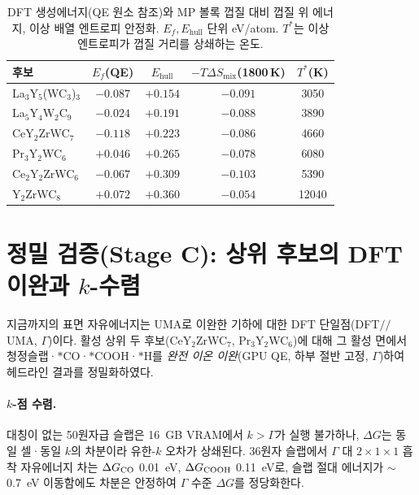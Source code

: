 \documentclass[11pt,a4paper]{report}
\begin{document}
\begin{table}[t]
\centering
\caption{DFT 생성에너지(QE 원소 참조)와 MP 볼록 껍질 대비 껍질 위 에너지, 이상 배열 엔트로피
안정화. $E_f, E_{\mathrm{hull}}$ 단위 eV/atom. $T^\ast$는 이상 엔트로피가 껍질 거리를 상쇄하는 온도.}
\label{tab:hull}
\small
\begin{tabular}{lcccc}
\hline
후보 & $E_f$(QE) & $E_{\mathrm{hull}}$ & $-T\Delta S_{\mathrm{mix}}$(1800\,K) & $T^\ast$(K) \\
\hline
La$_3$Y$_5$(WC$_3$)$_3$ & $-0.087$ & $+0.154$ & $-0.091$ & 3050 \\
La$_5$Y$_4$W$_2$C$_9$   & $-0.024$ & $+0.191$ & $-0.088$ & 3890 \\
CeY$_2$ZrWC$_7$         & $-0.118$ & $+0.223$ & $-0.086$ & 4660 \\
Pr$_3$Y$_2$WC$_6$       & $+0.046$ & $+0.265$ & $-0.078$ & 6080 \\
Ce$_2$Y$_2$ZrWC$_6$     & $-0.067$ & $+0.309$ & $-0.103$ & 5390 \\
Y$_2$ZrWC$_8$           & $+0.072$ & $+0.360$ & $-0.054$ & 12040 \\
\hline
\end{tabular}
\end{table}

\section{정밀 검증(Stage C): 상위 후보의 DFT 이완과 $k$-수렴}
\label{sec:stagec}
지금까지의 표면 자유에너지는 UMA로 이완한 기하에 대한 DFT 단일점(DFT$/\!/$UMA, $\Gamma$)이다. 활성
상위 두 후보(CeY$_2$ZrWC$_7$, Pr$_3$Y$_2$WC$_6$)에 대해 그 활성 면에서 청정슬랩·$*$CO·$*$COOH·$*$H를
\emph{완전 이온 이완}(GPU QE, 하부 절반 고정, $\Gamma$)하여 헤드라인 결과를 정밀화하였다.

\paragraph{$k$-점 수렴.} 대칭이 없는 50원자급 슬랩은 16~GB VRAM에서 $k>\Gamma$가 실행 불가하나,
$\Delta G$는 동일 셀·동일 $k$의 차분이라 유한-$k$ 오차가 상쇄된다. 36원자 슬랩에서 $\Gamma$ 대
$2{\times}1{\times}1$ 흡착 자유에너지 차는 $\Delta G_{\rm CO}$ 0.01~eV, $\Delta G_{\rm COOH}$ 0.11~eV로,
슬랩 절대 에너지가 $\sim$0.7~eV 이동함에도 차분은 안정하여 $\Gamma$ 수준 $\Delta G$를 정당화한다.
\end{document}
